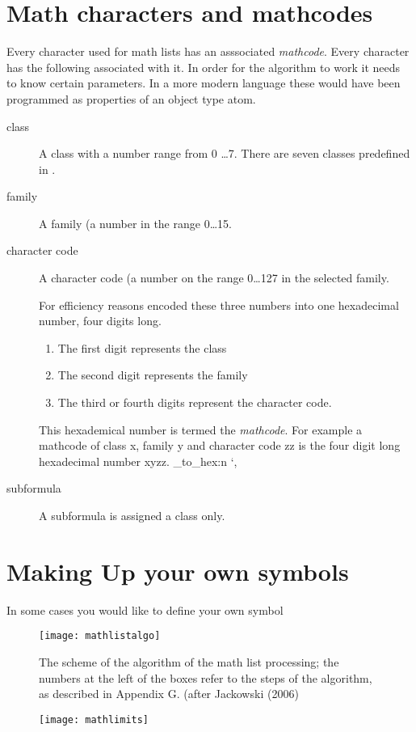 \section{Math characters and mathcodes}

Every character used for math lists has an asssociated \emph{mathcode}.  Every character has
the following associated with it. In order for the algorithm to work it needs to know certain parameters.
In a more modern language these would have been programmed as properties of an object type
atom.

\begin{description}
\item [class] A class with a number range from 0 \ldots 7.  There are seven classes predefined in \tex.
\item [family] A family (a number in the range 0\ldots15.
\item [character code] A character code (a number on the range 0\ldots127 in the selected family.


For efficiency reasons \tex encoded these three numbers into one hexadecimal number,
four digits long.

\begin{enumerate}
\item The first digit represents the class
\item The second digit represents the family
\item The third or fourth digits represent the character code.
\end{enumerate}

This hexademical number is termed the \emph{mathcode}. For example a mathcode of class x, family y and character code zz is the four digit long hexadecimal number xyzz.
\ExplSyntaxOn
\int_to_hex:n {\the\mathcode`,}
\ExplSyntaxOff

\item [subformula] A subformula is assigned a class only.

\end{description}


\section{Making Up your own symbols}

In some cases you would like to define your own symbol

\begin{figure}[htbp]
\texttt{[image: mathlistalgo]}
\caption{The scheme of the algorithm of the math list processing; the numbers at the left of the boxes refer to the steps of the algorithm, as described in Appendix G. (after Jackowski (2006)}
\end{figure}

\begin{figure}[htbp]
\texttt{[image: mathlimits]}
\end{figure}








